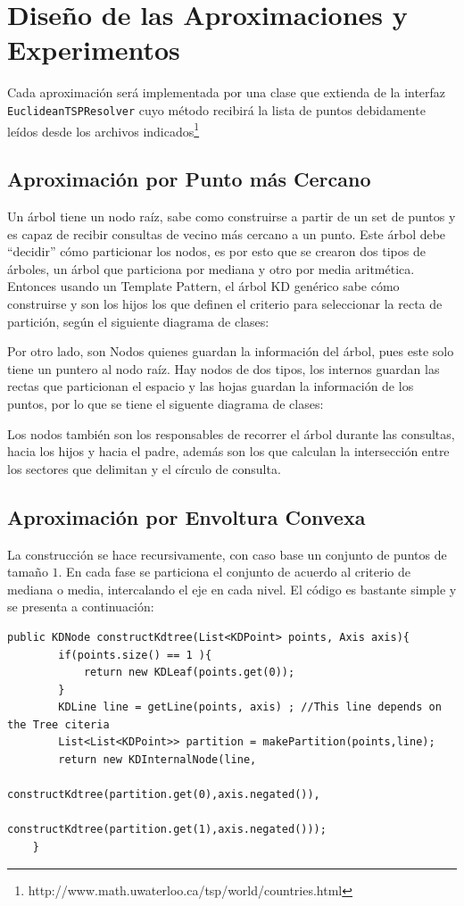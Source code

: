 \documentclass[12pt,letterpaper, margin = 3cm]{article}
\begin{document}
\newpage
\section{Diseño de las Aproximaciones y Experimentos}
Cada aproximación será implementada por una clase que extienda de la interfaz \verb+EuclideanTSPResolver+ cuyo método recibirá la lista de puntos debidamente leídos desde los archivos indicados\footnote{http://www.math.uwaterloo.ca/tsp/world/countries.html}

\subsection{Aproximación por Punto más Cercano}
Un árbol tiene un nodo raíz, sabe como construirse a partir de un set de puntos y es capaz de recibir consultas de vecino más cercano a un punto. Este árbol debe ``decidir'' cómo particionar los nodos, es por esto que se crearon dos tipos de árboles, un árbol que particiona por mediana y otro por media aritmética. Entonces usando un Template Pattern, el árbol KD genérico sabe cómo construirse y son los hijos los que definen el criterio para seleccionar la recta de partición, según el siguiente diagrama de clases:

Por otro lado, son Nodos quienes guardan la información del árbol, pues este solo tiene un puntero al nodo raíz. Hay nodos de dos tipos, los internos guardan las rectas que particionan el espacio y las hojas guardan la información de los puntos, por lo que se tiene el siguente diagrama de clases:

Los nodos también son los responsables de recorrer el árbol durante las consultas, hacia los hijos y hacia el padre, además son los que calculan la intersección entre los sectores que delimitan y el círculo de consulta.

\subsection{Aproximación por Envoltura Convexa}

La construcción se hace recursivamente, con caso base un conjunto de puntos de tamaño $1$. En cada fase se particiona el conjunto de acuerdo al criterio de mediana o media, intercalando el eje en cada nivel. El código es bastante simple y se presenta a continuación:
\begin{lstlisting}
public KDNode constructKdtree(List<KDPoint> points, Axis axis){
        if(points.size() == 1 ){
            return new KDLeaf(points.get(0));
        }
        KDLine line = getLine(points, axis) ; //This line depends on the Tree citeria
        List<List<KDPoint>> partition = makePartition(points,line);
        return new KDInternalNode(line,
                                  constructKdtree(partition.get(0),axis.negated()),
                                  constructKdtree(partition.get(1),axis.negated()));
    } 
\end{lstlisting}
\end{document}
